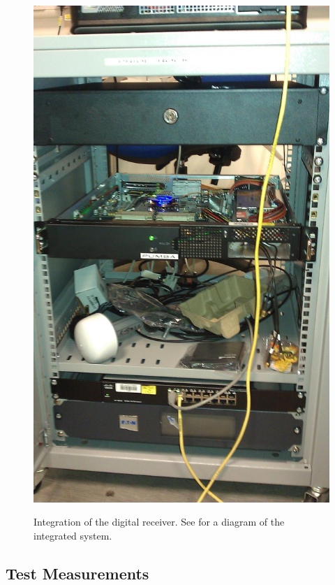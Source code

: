 \begin{figure}
{ \includegraphics[height=0.5\textheight]{./images/digitalReceiver/IMAG0315a.jpg}
 \label{fig:rackForDigital}
}
\caption{Integration of the digital receiver. See  for a diagram of the integrated system.}
\label{fig:digitalReceiverIntegration}


 
\end{figure}

\clearpage
\subsection{Test Measurements}
\label{sec:roachTests}

